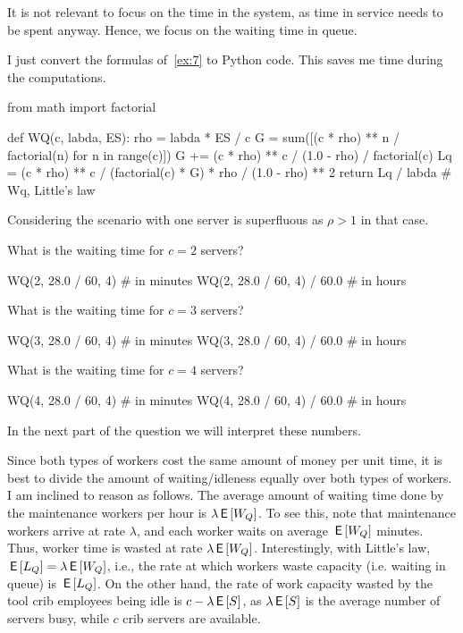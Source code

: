 \documentclass[companion]{subfiles}
\begin{document}
\begin{exercise}[Hall 5.10]
\begin{solution}
It is not relevant to focus on the time in the system, as time
 in service needs to be spent anyway. Hence, we focus on the waiting
 time in queue.


I just convert the formulas of~\cref{ex:7} to Python code. This saves
me time during the computations.

\begin{pyconsole}
from math import factorial

def WQ(c, labda, ES):
    rho = labda * ES / c
    G = sum([(c * rho) ** n / factorial(n) for n in range(c)])
    G += (c * rho) ** c / (1.0 - rho) / factorial(c)
    Lq = (c * rho) ** c / (factorial(c) * G) * rho / (1.0 - rho) ** 2
    return Lq / labda  # Wq, Little's law

\end{pyconsole} 

Considering the scenario with one server is superfluous as $\rho>1$ in
that case.

What is the waiting time for $c=2$ servers?

\begin{pyconsole}
WQ(2, 28.0 / 60, 4)  # in minutes
WQ(2, 28.0 / 60, 4) / 60.0  # in hours
\end{pyconsole}

What is the waiting time for $c=3$ servers?

\begin{pyconsole}
WQ(3, 28.0 / 60, 4)  # in minutes
WQ(3, 28.0 / 60, 4) / 60.0  # in hours
\end{pyconsole}


What is the waiting time for $c=4$ servers?

\begin{pyconsole}
WQ(4, 28.0 / 60, 4)  # in minutes
WQ(4, 28.0 / 60, 4) / 60.0  # in hours
\end{pyconsole} 

In the next part of the question we will interpret these numbers.

Since both types of workers cost the same amount of money per unit
time, it is best to divide the amount of waiting/idleness equally over
both types of workers. I am inclined to reason as follows. The
average amount of waiting time done by the maintenance workers per
hour is $\lambda \,\mathsf{E}\left[W_Q\right]$. To see this, note that maintenance workers arrive at rate $\lambda$, and each worker waits on average $\,\mathsf{E}\left[W_Q\right]$ minutes. Thus, worker time is wasted at rate $\lambda \,\mathsf{E}\left[W_Q\right]$. Interestingly, with Little's law, $\,\mathsf{E}\left[L_Q\right]=\lambda \,\mathsf{E}\left[W_Q\right]$, i.e., the rate at which workers waste capacity (i.e. waiting in queue) is $\,\mathsf{E}\left[L_Q\right]$. On the other hand, the rate of work capacity wasted by the tool crib employees being idle is $c-\lambda \,\mathsf{E}\left[S\right]$, as $\lambda \,\mathsf{E}\left[S\right]$ is the average number of servers busy, while $c$ crib servers are available.


\end{solution}
\end{exercise}
\end{document}
